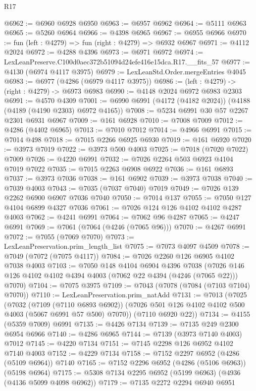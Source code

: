 \begin{lexlean}{R17}
\begin{coremodule}
@6962 := @6960 @6928 @6950
@6963 := @6957 @6962
@6964 := @5111 @6963
@6965 := @5260 @6964
@6966 := @4398 @6965
@6967 := @6955 @6966
@6970 := fun (left : @4279) => fun (right : @4279) => @6932 @6967
@6971 := @4112 @2024
@6972 := @4288 @4396
@6973 := @6971 @6972
@6974 := LexLeanPreserve.C100d0aec372b51094d24efe416e15dca.R17.__fits_57
@6977 := @4130 (@6974 @4117 @3975)
@6979 := LexLeanStd.Order.mergeEntries @4045
@6983 := @6977 (@4286 (@6979 @4117 @3975))
@6986 := (left : @4279) -> (right : @4279) -> @6973 @6983
@6990 := @4148 @2024 @6972 @6983 @2303
@6991 := @4570 @4309
@7001 := @6990 @6991 (@4172 (@4182 @2024)) (@4188 (@4189 (@4190 @2303) @6972 @4165))
@7008 := @5234 @6991 @30 @57 @2267 @2301 @6931 @6967
@7009 := @161 @6928
@7010 := @7008 @7009
@7012 := @4286 (@4402 @6965)
@7013 := @7010 @7012
@7014 := @4966 @6991
@7015 := @7014 @498
@7018 := @7015 @2266 @6925 @6930
@7019 := @161 @6920
@7020 := @3973 @7019
@7022 := @3973 @500 @4003
@7025 := @7018 (@7020 @7022) @7009
@7026 := @4220 @6991
@7032 := @7026 @2264 @503 @6923 @4104 @7019 @7022
@7035 := @7015 @2263 @6908 @6922
@7036 := @161 @6893
@7037 := @3973 @7036
@7038 := @161 @6902
@7039 := @3973 @7038
@7040 := @7039 @4003
@7043 := @7035 (@7037 @7040) @7019
@7049 := @7026 @139 @2262 @6900 @6907 @7036 @7040
@7050 := @7014 @137
@7055 := @7050 @127 @4104 @6899 @4327 @7036
@7061 := @7026 @124 @126 @4102 @4102 @4287 @4003
@7062 := @4241 @6991
@7064 := @7062 @96 @4287
@7065 := @4247 @6991
@7069 := @7061 (@7064 (@4246 (@7065 @96)))
@7070 := @4267 @6991
@7072 := @7055 (@7069 @7070)
@7073 := LexLeanPreservation.prim_length_list
@7075 := @7073 @4097 @4509
@7078 := @7049 (@7072 (@7075 @4117))
@7084 := @7026 @2260 @126 @6905 @4102 @7038 @4003
@7103 := @7050
    @148
    @4104
    @6904
    @4396
    @7038
    (@7026 @146 @126 @4102 @4102 @4394 @4003 (@7062 @22 @4394 (@4246 (@7065 @22))) @7070)
@7104 := @7075 @3975
@7109 := @7043 (@7078 (@7084 (@7103 @7104) @7070))
@7110 := LexLeanPreservation.prim_natAdd
@7131 := @7013
    (@7025
      (@7032
        (@7109 (@7110 @6893 @6902))
        (@7026 @501 @126 @4102 @4102 @500 @4003 (@5067 @6991 @57 @500) @7070))
      (@7110 @6920 @22))
@7134 := @4155 (@5359 @7009) @6991
@7135 := @4426 @7134
@7139 := @7135 @249 @2300 @6954 @6966
@7140 := @4286 @6965
@7144 := @7139 (@3973 @7140 @4003) @7012
@7145 := @4220 @7134
@7151 := @7145 @2298 @126 @6952 @4102 @7140 @4003
@7152 := @4229 @7134
@7158 := @7152 @2297 @6952 (@4286 (@5109 @6964)) @7140
@7165 := @7152 @2296 @6952 (@4286 (@5106 @6963)) (@5198 @6964)
@7175 := @5308 @7134 @2295 @6952 (@5199 @6963) (@4936 (@4136 @5099 @4098 @6962))
@7179 := @7135 @2272 @2294 @6940 @6951

\end{coremodule}
\end{lexlean}
